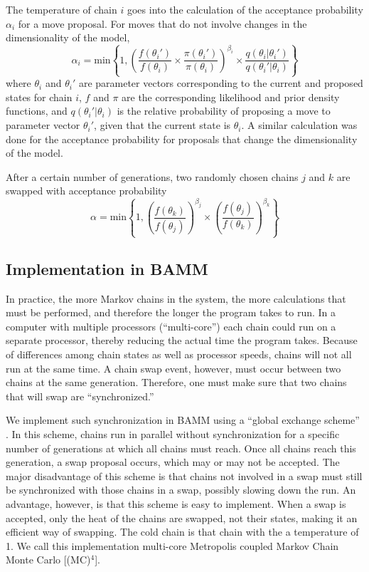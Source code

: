 \documentclass[12pt]{article}
\newcommand{\MCMCMCMC}{(MC)$^{4}$}
\begin{document}
The temperature of chain $i$ goes into the calculation
of the acceptance probability $\alpha_i$ for a move proposal.
%
For moves that do not involve changes in the dimensionality of the model,
\[\alpha_i = \text{min}\left\{ 1,
    \left(
    \frac{f(\theta_i')}{f(\theta_i)} \times
    \frac{\pi(\theta_i')}{\pi(\theta_i)}
    \right)^{\beta_i} \times
    \frac{q(\theta_i | \theta_i')}{q(\theta_i' | \theta_i)}
\right\}\]
where $\theta_i$ and $\theta_i'$ are parameter vectors
corresponding to the current and proposed states for chain $i$,
$f$ and $\pi$ are the corresponding likelihood and prior density functions,
and $q(\theta_i' | \theta_i)$ is the relative probability
of proposing a move to parameter vector $\theta_i'$,
given that the current state is $\theta_i$.
%
A similar calculation was done for the acceptance probability for proposals
that change the dimensionality of the model.

After a certain number of generations, two randomly chosen chains $j$ and $k$
are swapped with acceptance probability
\[\alpha = \text{min}\left\{ 1,
    \left(\frac{f(\theta_k)}{f(\theta_j)}\right)^{\beta_j} \times
    \left(\frac{f(\theta_j)}{f(\theta_k)}\right)^{\beta_k}
\right\}\]


\subsection*{Implementation in BAMM}

In practice, the more Markov chains in the system,
the more calculations that must be performed,
and therefore the longer the program takes to run.
%
In a computer with multiple processors (``multi-core'')
each chain could run on a separate processor,
thereby reducing the actual time the program takes.
%
Because of differences among chain states as well as processor speeds,
chains will not all run at the same time.
%
A chain swap event, however, must occur between two chains
at the same generation.
%
Therefore, one must make sure that two chains that will swap
are ``synchronized.''


We implement such synchronization in BAMM
using a ``global exchange scheme'' \citep{alt04}.
%
In this scheme, chains run in parallel without synchronization
for a specific number of generations at which all chains must reach.
%
Once all chains reach this generation, a swap proposal occurs,
which may or may not be accepted.
%
The major disadvantage of this scheme
is that chains not involved in a swap
must still be synchronized with those chains in a swap,
possibly slowing down the run.
%
An advantage, however, is that this scheme is easy to implement.
%
When a swap is accepted, only the heat of the chains are swapped,
not their states, making it an efficient way of swapping.
%
The cold chain is that chain with the a temperature of 1.
%
We call this implementation
multi-core Metropolis coupled Markov Chain Monte Carlo [\MCMCMCMC].
\end{document}
